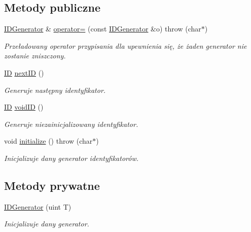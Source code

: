 \subsection*{Metody publiczne}
\begin{DoxyCompactItemize}
\item 
\hyperlink{classIDGenerator}{IDGenerator} \& \hyperlink{classIDGenerator_a1cead736be7f5fae000fe1c5f225234b}{operator=} (const \hyperlink{classIDGenerator}{IDGenerator} \&o)  throw (char$\ast$)
\begin{DoxyCompactList}\small\item\em Przeładowany operator przypisania dla upewnienia się, że żaden generator nie zostanie zniszczony. \item\end{DoxyCompactList}\item 
\hyperlink{classIDGenerator_1_1ID}{ID} \hyperlink{classIDGenerator_a5e7eba106b14d8d09974bb6330476926}{nextID} ()
\begin{DoxyCompactList}\small\item\em Generuje następny identyfikator. \item\end{DoxyCompactList}\item 
\hyperlink{classIDGenerator_1_1ID}{ID} \hyperlink{classIDGenerator_ad5c8d7b639350d1f19dd990d850179c1}{voidID} ()
\begin{DoxyCompactList}\small\item\em Generuje niezainicjalizowany identyfikator. \item\end{DoxyCompactList}\item 
void \hyperlink{classIDGenerator_a16c5cba9a30dc95d05b72a1253fb54b2}{initialize} ()  throw (char$\ast$)
\begin{DoxyCompactList}\small\item\em Inicjalizuje dany generator identyfikatorów. \item\end{DoxyCompactList}\end{DoxyCompactItemize}
\subsection*{Metody prywatne}
\begin{DoxyCompactItemize}
\item 
\hyperlink{classIDGenerator_a9211b96bb2de7ec0479483c04b0263a5}{IDGenerator} (uint T)
\begin{DoxyCompactList}\small\item\em Inicjalizuje dany generator. \item\end{DoxyCompactList}\end{DoxyCompactItemize}
